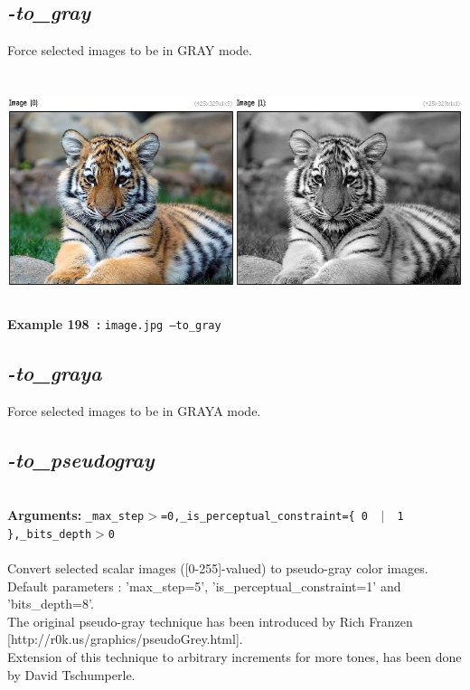 \documentclass[a4paper,11pt,twoside]{book}
\begin{document}
\subsection{\emph{-to\_gray} }\vspace*{-0.5em}
Force selected images to be in GRAY mode.
\begin{center}\includegraphics[keepaspectratio=true,height=7cm,width=\textwidth]{img/gmic_def198.jpg}\\
{\footnotesize \textbf{Example 198~:} \texttt{image.jpg --to\_gray}}
\end{center}

\subsection{\emph{-to\_graya} }\vspace*{-0.5em}
Force selected images to be in GRAYA mode.


\subsection{\emph{-to\_pseudogray} }\vspace*{-0.5em}
~\\\textbf{Arguments: } 
{\small \texttt{\_max\_step$>$=0,\_is\_perceptual\_constraint=\{ 0 ~$|$~ 1 \},\_bits\_depth$>$0}}\\~\\
Convert selected scalar images ([0-255]-valued) to pseudo-gray color images.
~\\Default parameters : 'max\_step=5', 'is\_perceptual\_constraint=1' and 'bits\_depth=8'.
~\\The original pseudo-gray technique has been introduced by Rich Franzen [http://r0k.us/graphics/pseudoGrey.html].
~\\Extension of this technique to arbitrary increments for more tones, has been done by David Tschumperle.
\end{document}
